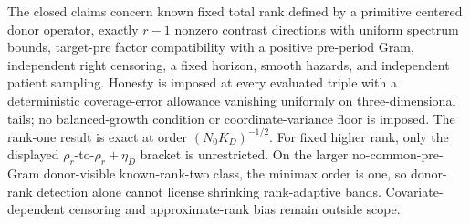 The closed claims concern known fixed total rank defined by a primitive centered donor operator, exactly \(r-1\) nonzero contrast directions with uniform spectrum bounds, target-pre factor compatibility with a positive pre-period Gram, independent right censoring, a fixed horizon, smooth hazards, and independent patient sampling. Honesty is imposed at every evaluated triple with a deterministic coverage-error allowance vanishing uniformly on three-dimensional tails; no balanced-growth condition or coordinate-variance floor is imposed. The rank-one result is exact at order \((N_0K_D)^{-1/2}\). For fixed higher rank, only the displayed \(\rho_r\)-to-\(\rho_r+\eta_D\) bracket is unrestricted. On the larger no-common-pre-Gram donor-visible known-rank-two class, the minimax order is one, so donor-rank detection alone cannot license shrinking rank-adaptive bands. Covariate-dependent censoring and approximate-rank bias remain outside scope.